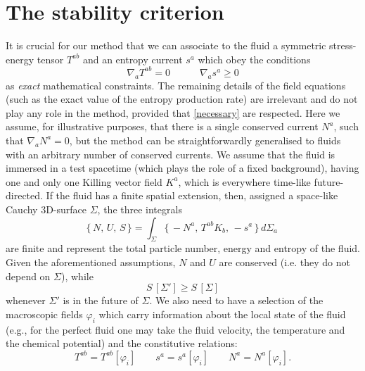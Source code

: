 \documentclass[a4paper, amsfonts, amssymb, amsmath, reprint, showkeys, nofootinbib, twoside, onecolumn,notitlepage]{revtex4-1}
\begin{document}
\section{The stability criterion}

It is crucial for our method that we can associate to the fluid a symmetric stress-energy tensor $T^{ab}$ and an entropy current $s^a$ which obey the conditions
\begin{equation}\label{necessary}
\nabla_a T^{ab}=0 \quad \quad \quad \nabla_a s^a \geq 0
\end{equation} 
as \textit{exact} mathematical constraints. The remaining details of the field equations (such as the exact value of the entropy production rate) are irrelevant and do not play any role in the method, provided that \eqref{necessary} are respected. Here we assume, for illustrative purposes, that there is a single conserved current $N^a$, such that $\nabla_a N^a=0$, but the method can be straightforwardly generalised to fluids with an arbitrary number of conserved currents.
We assume that the fluid is immersed in a test spacetime (which plays the role of a fixed background), having one and only one Killing vector field $K^a$, which is everywhere time-like future-directed. If the fluid has a finite spatial extension, then, assigned a space-like Cauchy 3D-surface $\Sigma$, the three integrals
\begin{equation}\label{due}
\{ \, N, \, U, \, S \, \} = \int_\Sigma \{ \, -N^a, \, T^{ab}K_b, \, -s^a \, \} \, d\Sigma_a \, 
\end{equation}
are finite and represent the total particle number, energy and entropy of the fluid. Given the aforementioned assumptions, $N$ and $U$ are conserved (i.e. they do not depend on $\Sigma$), while 
\begin{equation}\label{Entrppi}
S \,[\Sigma'] \geq S \,[\Sigma]
\end{equation}
whenever $\Sigma'$ is in the future of $\Sigma$. We also need to have a selection of the macroscopic fields $\varphi_i$ which carry information about the local state of the fluid (e.g., for the perfect fluid one may take the fluid velocity, the temperature and the chemical potential) and the constitutive relations:
\begin{equation}\label{constutiveingeneral}
T^{ab}=T^{ab}[\varphi_i] \quad \quad s^{a}=s^{a}[\varphi_i] \quad \quad N^{a}=N^{a}[\varphi_i].
\end{equation}
\end{document}
